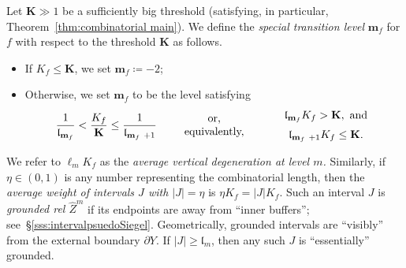 \documentclass{amsart}
\renewcommand{\sp}{{\ \ }}
\newcommand{\1}{{\mathbb 1 }}
\newcommand{\wZ}{{\widehat Z}}
\newcommand{\bK}{{\mathbf K}}
\newcommand{\bbm}{{\mathbf m}}
\newcommand{\length}{{\mathfrak l}}
\theoremstyle{remark}
\numberwithin{equation}{section}
\theoremstyle{definition}
\begin{document}
Let $\bK\gg 1$ be a sufficiently big threshold (satisfying, in particular, Theorem~\ref{thm:combinatorial main}).
We define the {\em special transition level} $\bbm_f$ for $f$ with respect to the threshold $\bK$ as follows. 
\begin{itemize}
    \item If $K_f\le \bK$, we set $\bbm_f\coloneqq -2$;
    \item Otherwise, we set $\bbm_f$ to be the level satisfying 
\[ \frac{1}{\length_{\bbm_f}} < \frac{K_f}{\bK} \le \frac{1}{\length_{\bbm_f\ +1}} \sp\sp\sp  \begin{array}{c}\text{ or, }\\ \text{equivalently,}\end{array}\sp\sp\sp \sp   \begin{array}{c}
\length_{\bbm_f} K_f>\bK, \text{ and}\vspace{0.2cm}\\
\length_{\bbm_f\ +1} K_f\le \bK.
\end{array} \]
\end{itemize} 


We refer to $\ell_m K_f$ as the \emph{average vertical degeneration at level $m$.}  Similarly, if $\eta\in (0,1)$ is any number representing the combinatorial length, then the \emph{average weight of intervals $J$ with $|J|=\eta$} is $\eta K_f=|J|K_f$. Such an interval $J$ is \emph{grounded rel $\wZ^m$} if its endpoints are away from ``inner buffers''; see~\S\ref{sss:intervalpsuedoSiegel}. Geometrically, grounded intervals are ``visibly'' from the external boundary $\partial Y$. If $|J|\ge \length_m$, then any such $J$ is ``essentially'' grounded.
\end{document}
